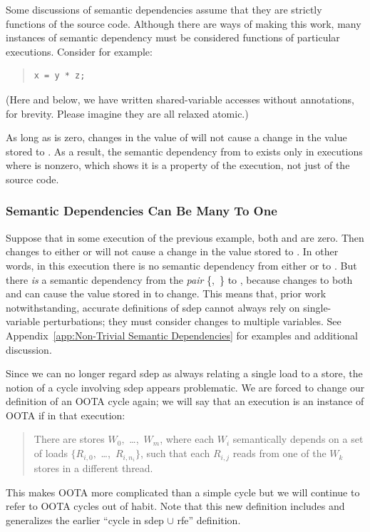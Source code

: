 \documentclass[10]{article}
\begin{document}
Some discussions of semantic dependencies assume that they
are strictly functions of the source code.
Although there are ways of making this work, many instances of
semantic dependency must be considered functions of particular executions.
Consider for example:
\begin{quote}
\begin{verbatim}
x = y * z;
\end{verbatim}
\end{quote}
(Here and below, we have written shared-variable accesses without
annotations, for brevity.  Please imagine they are all relaxed atomic.)

As long as  is zero, changes in the
value of  will not cause a change in the value stored to .
As a result, the semantic dependency from  to  exists only
in executions where  is nonzero,
which shows it is a property of the execution, not just of the source code.

\subsubsection{Semantic Dependencies Can Be Many To One}
\label{sec:Semantic Dependencies Can Be Many To One}

Suppose that in some execution of the previous example,
both  and  are zero.
Then changes to either  or 
will not cause a change in the value stored to .
In other words, in this execution there is no semantic dependency
from either  or  to .
But there \emph{is} a semantic dependency from the \emph{pair}
\{,~\} to ,
because changes to both  and 
can cause the value stored in  to change.
This means that, prior work~\cite{PaulEMcKenney2016OOTA}
notwithstanding, accurate definitions of sdep cannot always rely on
single-variable perturbations;
they must consider changes to multiple variables.
See Appendix~\ref{app:Non-Trivial Semantic Dependencies}
for examples and additional discussion.

Since we can no longer regard sdep as always relating a single load to a store,
the notion of a cycle involving sdep appears problematic.
We are forced to change our definition of an OOTA cycle again;
we will say that an execution is an instance of OOTA if in that execution:
\begin{quote}
	There are stores $W_0,$ \ldots,~$W_m$,
	where each $W_i$ semantically depends on a set of loads
	$\{R_{i,0},$ \ldots,~$R_{i,n_i}\}$,
	such that each $R_{i,j}$ reads from one of the $W_k$
	stores in a different thread.
\end{quote}
This makes OOTA more complicated than a simple cycle but
we will continue to refer to OOTA cycles out of habit.
Note that this new definition includes and generalizes the earlier
``cycle in sdep $\cup$ rfe'' definition.
\end{document}
